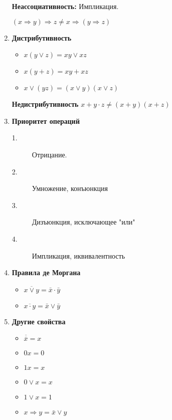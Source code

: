 \documentclass[a4paper,12pt]{article}
\begin{document}
\begin{enumerate}
        \textbf {Неассоциативность:} Импликация.

        $(x\Longrightarrow y) \Longrightarrow z \neq x\Longrightarrow (y \Longrightarrow z)$

        \item \textbf{Дистрибутивность}

        \begin{itemize}
            \item $x(y\vee z)= xy\vee xz$
            \item $x(y+z)=xy+xz$
            \item $x\vee (yz)=(x\vee y)(x\vee z)$
        \end{itemize}

        \textbf{Недистрибутивность}
        $x+y\cdot z \neq (x+y)(x+z)$

        \item \textbf{Приоритет операций}

        \begin{description}
            \item[1.] Отрицание.
            \item[2.] Умножение, конъюнкция
            \item[3.] Дизъюнкция, исключающее "или"
            \item[4.] Импликация, иквивалентность
        \end{description}

        \item \textbf{Правила де Моргана}

        \begin{itemize}
            \item $ \overline{x\vee y} = \bar x \cdot \bar y $
            \item $\overline{x\cdot y} = \bar x \vee \bar y$
        \end{itemize}

        \item \textbf{Другие свойства}

        \begin{minipage}{0.4\textwidth}
            \begin{itemize}
                \item $\overline{\overline{x}}=x$
                \item $0x=0$
                \item $1x=x$
            \end{itemize}
        \end{minipage}
        \hfill
        \begin{minipage}{0.4\textwidth}
            \begin{itemize}
                \item $0\vee x=x$
                \item $1\vee x=1$
                \item $x\Longrightarrow y = \bar x \vee y$
            \end{itemize}
        \end{minipage}

    \end{enumerate}
\end{document}
